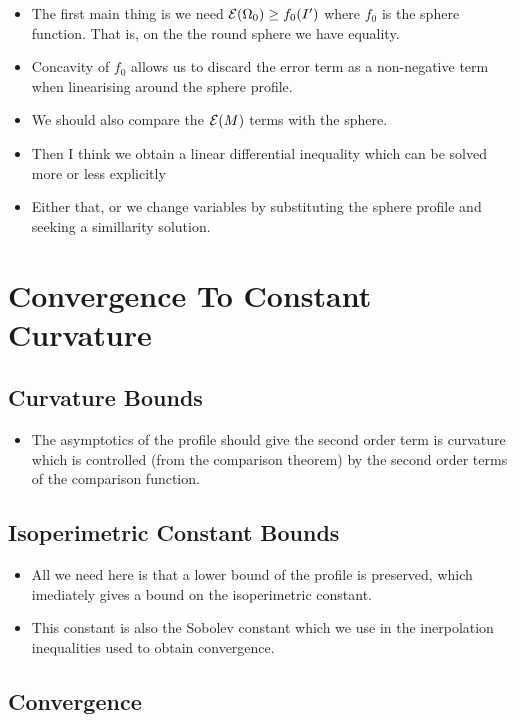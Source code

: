 \documentclass{amsart}
\begin{document}
\begin{itemize}
\item The first main thing is we need \(\operatorname{\mathcal{E}}(\Omega_0) \geq f_0(I')\) where \(f_0\) is the sphere function. That is, on the the round sphere we have equality.
\item Concavity of \(f_0\) allows us to discard the error term as a non-negative term when linearising around the sphere profile.
\item We should also compare the \(\operatorname{\mathcal{E}}(M)\) terms with the sphere.
\item Then I think we obtain a linear differential inequality which can be solved more or less explicitly
\item Either that, or we change variables by substituting the sphere profile and seeking a simillarity solution.
\end{itemize}

\section{Convergence To Constant Curvature}

\subsection{Curvature Bounds}

\begin{itemize}
\item The asymptotics of the profile should give the second order term is curvature which is controlled (from the comparison theorem) by the second order terms of the comparison function.
\end{itemize}

\subsection{Isoperimetric Constant Bounds}

\begin{itemize}
\item All we need here is that a lower bound of the profile is preserved, which imediately gives a bound on the isoperimetric constant.
\item This constant is also the Sobolev constant which we use in the inerpolation inequalities used to obtain convergence.
\end{itemize}


\subsection{Convergence}
\end{document}
